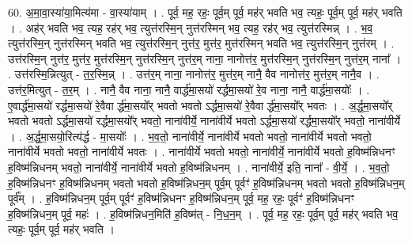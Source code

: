 \documentclass[17pt]{extarticle}
\begin{document}
60. अ॒मा॒वा॒स्या॑या॒मित्य॑मा - वा॒स्या॑याम् । . पूर्व॒ मह॒ रहः॒ पूर्व॒म् पूर्व॒ मह॑र् भवति भव॒ त्यहः॒ पूर्व॒म् पूर्व॒ मह॑र् भवति । . अह॑र् भवति भव॒ त्यह॒ रह॑र् भव॒ त्युत्त॑रस्मि॒न् नुत्त॑रस्मिन् भव॒ त्यह॒ रह॑र् भव॒ त्युत्त॑रस्मिन्न् । . भ॒व॒ त्युत्त॑रस्मि॒न् नुत्त॑रस्मिन् भवति भव॒ त्युत्त॑रस्मि॒न् नुत्त॑र॒ मुत्त॑र॒ मुत्त॑रस्मिन् भवति भव॒ त्युत्त॑रस्मि॒न् नुत्त॑रम् । . उत्त॑रस्मि॒न् नुत्त॑र॒ मुत्त॑र॒ मुत्त॑रस्मि॒न् नुत्त॑रस्मि॒न् नुत्त॑र॒म् नाना॒ नानोत्त॑र॒ मुत्त॑रस्मि॒न् नुत्त॑रस्मि॒न् नुत्त॑र॒म् नाना᳚ । . उत्त॑रस्मि॒न्नित्युत् - त॒र॒स्मि॒न्न् । . उत्त॑र॒म् नाना॒ नानोत्त॑र॒ मुत्त॑र॒म् नानै॒ वैव नानोत्त॑र॒ मुत्त॑र॒म् नानै॒व । . उत्त॑र॒मित्युत् - त॒र॒म् । . नानै॒ वैव नाना॒ नानै॒ वार्द्ध॑मा॒सयो॑ रर्द्धमा॒सयो॑ रे॒व नाना॒ नानै॒ वार्द्ध॑मा॒सयोः᳚ । . ए॒वार्द्ध॑मा॒सयो॑ रर्द्धमा॒सयो॑ रे॒वैवा र्द्ध॑मा॒सयो᳚र् भवतो भवतो ऽर्द्धमा॒सयो॑ रे॒वैवा र्द्ध॑मा॒सयो᳚र् भवतः । . अ॒र्द्ध॒मा॒सयो᳚र् भवतो भवतो ऽर्द्धमा॒सयो॑ रर्द्धमा॒सयो᳚र् भवतो॒ नाना॑वीर्ये॒ नाना॑वीर्ये भवतो ऽर्द्धमा॒सयो॑ रर्द्धमा॒सयो᳚र् भवतो॒ नाना॑वीर्ये । . अ॒र्द्ध॒मा॒सयो॒रित्य॑र्द्ध - मा॒सयोः᳚ । . भ॒व॒तो॒ नाना॑वीर्ये॒ नाना॑वीर्ये भवतो भवतो॒ नाना॑वीर्ये भवतो भवतो॒ नाना॑वीर्ये भवतो भवतो॒ नाना॑वीर्ये भवतः । . नाना॑वीर्ये भवतो भवतो॒ नाना॑वीर्ये॒ नाना॑वीर्ये भवतो ह॒विष्म॑न्निधनꣳ ह॒विष्म॑न्निधनम् भवतो॒ नाना॑वीर्ये॒ नाना॑वीर्ये भवतो ह॒विष्म॑न्निधनम् । . नाना॑वीर्ये॒ इति॒ नाना᳚ - वी॒र्ये॒ । . भ॒व॒तो॒ ह॒विष्म॑न्निधनꣳ ह॒विष्म॑न्निधनम् भवतो भवतो ह॒विष्म॑न्निधन॒म् पूर्व॒म् पूर्वꣳ॑ ह॒विष्म॑न्निधनम् भवतो भवतो ह॒विष्म॑न्निधन॒म् पूर्व᳚म् । . ह॒विष्म॑न्निधन॒म् पूर्व॒म् पूर्वꣳ॑ ह॒विष्म॑न्निधनꣳ ह॒विष्म॑न्निधन॒म् पूर्व॒ मह॒ रहः॒ पूर्वꣳ॑ ह॒विष्म॑न्निधनꣳ ह॒विष्म॑न्निधन॒म् पूर्व॒ महः॑ । . ह॒विष्म॑न्निधन॒मिति॑ ह॒विष्म॑त् - नि॒ध॒न॒म् । . पूर्व॒ मह॒ रहः॒ पूर्व॒म् पूर्व॒ मह॑र् भवति भव॒ त्यहः॒ पूर्व॒म् पूर्व॒ मह॑र् भवति । \newline
\end{document}
